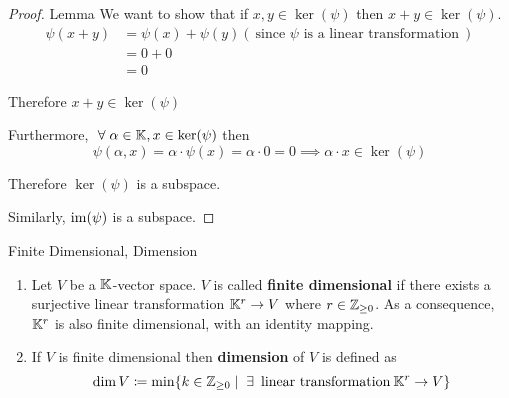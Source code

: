 \begin{proof} {Lemma}    
    We want to show that if \(x, y \in \ker(\psi)\) then \(x + y \in \ker(\psi)\).
    \[
        \begin{split}  
            \psi(x + y) &= \psi(x) + \psi(y) (\:\text{since \(\psi\) is a linear transformation}\: ) \\
            & = 0 + 0 \\
            &= 0
        \end{split}
    \]

    Therefore \(x + y \in \ker(\psi)\)

    Furthermore, \(\forall \alpha \in \bbk, x \in \ker(\psi)\) then \[
    \psi(\alpha, x) = \alpha \cdot \psi(x) = \alpha \cdot 0 = 0 \implies \alpha \cdot x \in \ker(\psi)
    \]

    Therefore \(\ker(\psi)\) is a subspace.

    Similarly, \(\mathrm{im}(\psi)\) is a subspace.
\end{proof}
\begin{definition} {Finite Dimensional, Dimension}
    \begin{enumerate}
        \item Let \(V\) be a \(\mathbb{K}\)-vector space. \(V\) is called \textbf{finite dimensional} if there exists a surjective linear transformation \(\mathbb{K}^r \to V\) where \(r \in \mathbb{Z}_{\geq 0}\). As a consequence, \(\mathbb{K}^r\) is also finite dimensional, with an identity mapping.
        \item If $V$ is finite dimensional then \textbf{dimension} of $V$ is defined as \[\dim V \coloneqq \min\{k \in \bbz_{\geq 0} \mid \exists \:\text{linear transformation}\: \bbk^r \to V\}\]
    \end{enumerate}
\end{definition}
